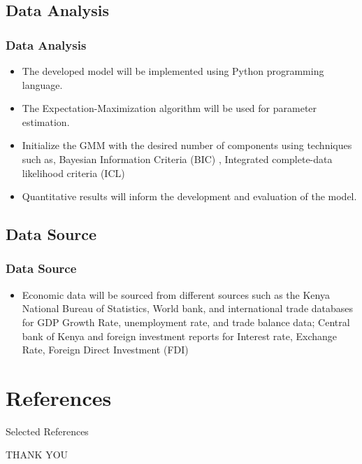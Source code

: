 \documentclass[unknownkeysallowed]{beamer}
\begin{document}
\subsection{Data Analysis}
\begin{frame}
	\frametitle{Data Analysis}
	\begin{itemize}
		\item The developed model will be implemented using Python programming language.
		\item The Expectation-Maximization algorithm will be used for parameter estimation.
		\item Initialize the GMM with the desired number of components using techniques such as, Bayesian Information Criteria (BIC) \cite{fraley1998many}, Integrated complete-data likelihood criteria (ICL) \cite{biernacki2000assessing}
		\item Quantitative results will inform the development and evaluation of the model.
	\end{itemize}
\end{frame}

\subsection{Data Source}
\begin{frame}
	\frametitle{Data Source}
	\begin{itemize}
		\item Economic data will be sourced from different sources such as the Kenya National Bureau of Statistics, World bank, and international trade databases for GDP Growth Rate, unemployment rate, and trade balance data; Central bank of Kenya and foreign investment reports for Interest rate, Exchange Rate, Foreign Direct Investment (FDI)
	\end{itemize}
\end{frame}



					
\section{References}
\begin{frame}{Selected References}
   \small
	
	
	
\end{frame}


	\begin{frame}[plain]
		\begin{center}
			\LARGE{THANK YOU\\}
		\end{center}
	\end{frame}
\end{document}
